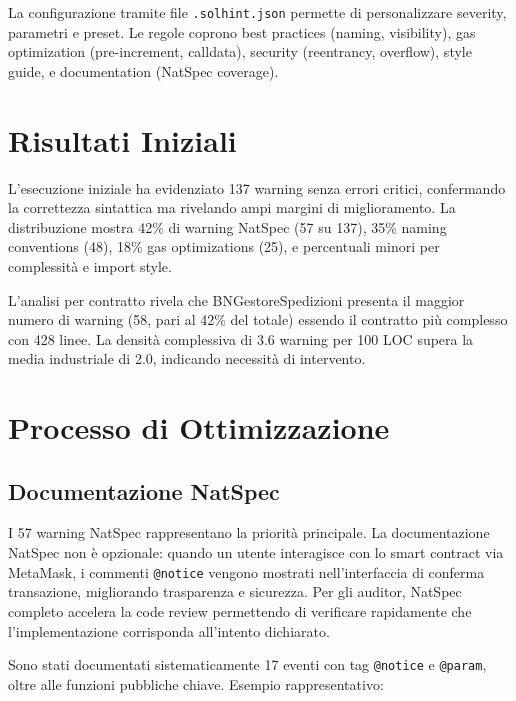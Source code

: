 \documentclass[12pt,a4paper]{article}
\begin{document}
La configurazione tramite file \texttt{.solhint.json} permette di personalizzare severity, parametri e preset. Le regole coprono best practices (naming, visibility), gas optimization (pre-increment, calldata), security (reentrancy, overflow), style guide, e documentation (NatSpec coverage).

\section{Risultati Iniziali}

L'esecuzione iniziale ha evidenziato 137 warning senza errori critici, confermando la correttezza sintattica ma rivelando ampi margini di miglioramento. La distribuzione mostra 42\% di warning NatSpec (57 su 137), 35\% naming conventions (48), 18\% gas optimizations (25), e percentuali minori per complessità e import style.

L'analisi per contratto rivela che BNGestoreSpedizioni presenta il maggior numero di warning (58, pari al 42\% del totale) essendo il contratto più complesso con 428 linee. La densità complessiva di 3.6 warning per 100 LOC supera la media industriale di 2.0, indicando necessità di intervento.

\section{Processo di Ottimizzazione}

\subsection{Documentazione NatSpec}

I 57 warning NatSpec rappresentano la priorità principale. La documentazione NatSpec non è opzionale: quando un utente interagisce con lo smart contract via MetaMask, i commenti \texttt{@notice} vengono mostrati nell'interfaccia di conferma transazione, migliorando trasparenza e sicurezza. Per gli auditor, NatSpec completo accelera la code review permettendo di verificare rapidamente che l'implementazione corrisponda all'intento dichiarato.

Sono stati documentati sistematicamente 17 eventi con tag \texttt{@notice} e \texttt{@param}, oltre alle funzioni pubbliche chiave. Esempio rappresentativo:
\end{document}
